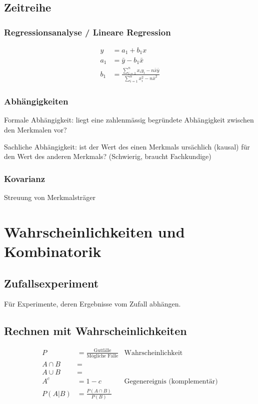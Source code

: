 \subsection{Zeitreihe}

\subsubsection{Regressionsanalyse / Lineare Regression}

\begin{align*}
y &= a_1 + b_1 x\\
a_1 &= \bar{y} - b_1 \bar{x} \\
b_1 &= \frac{\sum^{n}_{i=1}{x_iy_i-n\bar{x}\bar{y}}}{\sum^n_{i=1}{x^2_i - n\bar{x}^2}}
\end{align*}

\subsubsection{Abhängigkeiten}
Formale Abhängigkeit: liegt eine zahlenmässig begründete Abhängigkeit zwischen den Merkmalen vor?

Sachliche Abhängigkeit: ist der Wert des einen Merkmals ursächlich (kausal) für den Wert des anderen Merkmals? (Schwierig, braucht Fachkundige)

\subsubsection{Kovarianz}
Streuung von Merkmalsträger

\section{Wahrscheinlichkeiten und Kombinatorik}

\subsection{Zufallsexperiment}

Für Experimente, deren Ergebnisse vom Zufall abhängen.

\subsection{Rechnen mit Wahrscheinlichkeiten}

\begin{align*}
P &=  \frac{\text{Gutfälle}}{\text{Mögliche Fälle}} & \text{Wahrscheinlichkeit}\\
A \cap B &= \\
A \cup B &= \\
A^c &= 1 - c & \text{Gegenereignis (komplementär)} \\
P(A|B) &= \frac{P(A \cap B)}{P(B)}
\end{align*}

